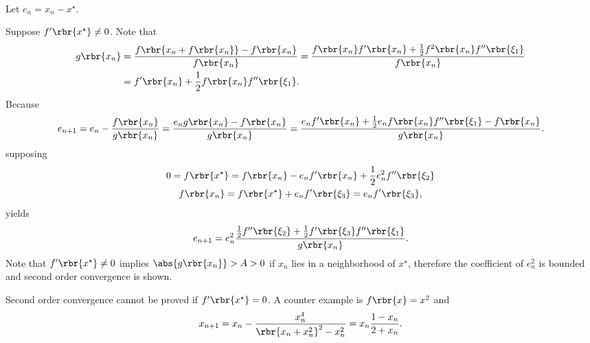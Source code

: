 \documentclass[english, nochinese]{../textmpls/pkupaper}
\begin{document}
\begin{thmquestion}
\ 
\begin{thmproof}
Let $ e_n = x_n - x^{\star} $.

Suppose $ f' \rbr{x^{\star}} \neq 0 $. Note that
\begin{equation}
\begin{split}
g \rbr{x_n} &= \frac{ f \rbr{ x_n + f \rbr{x_n} } - f \rbr{x_n} }{ f \rbr{x_n} } = \frac{ f \rbr{x_n} f' \rbr{x_n} + \frac{1}{2} f^2 \rbr{x_n} f'' \rbr{\xi_1} }{ f \rbr{x_n} } \\
&= f' \rbr{x_n} + \frac{1}{2} f \rbr{x_n} f'' \rbr{\xi_1}.
\end{split}
\end{equation}
Because
\begin{equation}
e_{ n + 1 } = e_n - \frac{ f \rbr{x_n} }{ g \rbr{x_n} } = \frac{ e_n g \rbr{x_n} - f \rbr{x_n} }{ g \rbr{x_n} } = \frac{ e_n f' \rbr{x_n} + \frac{1}{2} e_n f \rbr{x_n} f'' \rbr{\xi_1} - f \rbr{x_n} }{ g \rbr{x_n} }.
\end{equation}
supposing
\begin{gather}
0 = f \rbr{x^{\star}} = f \rbr{x_n} - e_n f' \rbr{x_n} + \frac{1}{2} e_n^2 f'' \rbr{\xi_2} \\
f \rbr{x_n} = f \rbr{x^{\star}} + e_n f' \rbr{\xi_3} = e_n f' \rbr{\xi_3},
\end{gather}
yields
\begin{equation}
e_{ n + 1 } = e_n^2 \frac{ \frac{1}{2} f'' \rbr{\xi_2} + \frac{1}{2} f' \rbr{\xi_3} f'' \rbr{\xi_1} }{ g \rbr{x_n} }.
\end{equation}
Note that $ f' \rbr{x^{\star}} \neq 0 $ implies $ \abs{ g \rbr{x_n} } > A > 0 $ if $x_n$ lies in a neighborhood of $x^{\star}$, therefore the coefficient of $e_n^2$ is bounded and second order convergence is shown.

Second order convergence cannot be proved if $ f' \rbr{x^{\star}} = 0 $. A counter example is $ f \rbr{x} = x^2 $ and
\begin{equation}
x_{ n + 1 } = x_n - \frac{x_n^4}{ \rbr{ x_n + x_n^2 }^2 - x_n^2 } = x_n \frac{ 1 - x_n }{ 2 + x_n }.
\end{equation}

\sqed
\end{thmproof}
\end{thmquestion}
\end{document}
